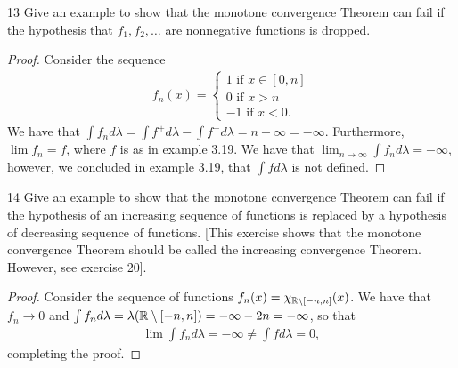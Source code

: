 \begin{exercise}{13}
Give an example to show that the monotone convergence Theorem can fail if the hypothesis that $f_1, f_2, \dots$ are nonnegative functions is dropped.
\end{exercise}
\begin{proof}
Consider the sequence
\begin{align*}
    f_n(x) = 
    \begin{cases}
        1 \text{ if } x \in [0,n]\\
        0 \text{ if } x > n\\
        -1 \text{ if } x < 0.
    \end{cases}
\end{align*}
We have that $\int f_n d\lambda = \int f^+ d\lambda - \int f^- d\lambda = n - \infty = -\infty$.
Furthermore, $\lim f_n = f$, where $f$ is as in example 3.19.
We have that $\lim_{n \to \infty} \int f_n d\lambda = -\infty$, however, we concluded in example 3.19, that $\int f d\lambda$ is not defined.
\end{proof} 

\begin{exercise}{14}
Give an example to show that the monotone convergence Theorem can fail if the hypothesis of an increasing sequence of functions is replaced by a hypothesis of decreasing sequence of functions.
[This exercise shows that the monotone convergence Theorem should be called the increasing convergence Theorem.
However, see exercise 20].
\end{exercise}
\begin{proof}
Consider the sequence of functions $f_n(x) = \chi_{\mathbb{R} \setminus [-n, n]}(x)$.
We have that $f_n \to 0$ and $\int f_n d\lambda = \lambda(\mathbb{R} \setminus [-n,n]) = -\infty - 2n = -\infty$, so that 
\begin{align*}
    \lim \int f_n d\lambda = -\infty \neq \int f d\lambda = 0,
\end{align*}
completing the proof.
\end{proof} 

